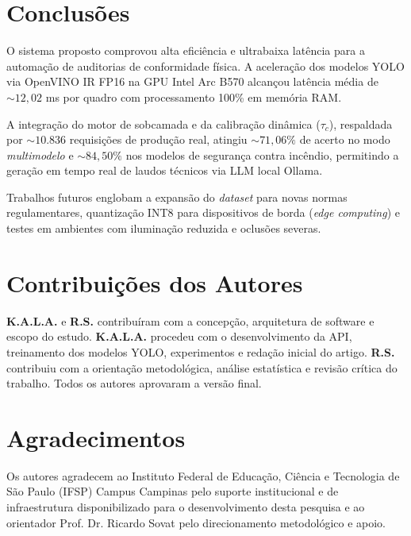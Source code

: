 \documentclass[a4paper,11pt]{article}
\begin{document}
\section*{Conclusões}
O sistema proposto comprovou alta eficiência e ultrabaixa latência para a automação de auditorias de conformidade física. A aceleração dos modelos YOLO via OpenVINO IR FP16 na GPU Intel Arc B570 alcançou latência média de $\sim 12{,}02$ ms por quadro com processamento 100\% em memória RAM.

A integração do motor de sobcamada e da calibração dinâmica ($\tau_c$), respaldada por $\sim 10.836$ requisições de produção real, atingiu $\sim 71{,}06\%$ de acerto no modo \textit{multimodelo} e $\sim 84{,}50\%$ nos modelos de segurança contra incêndio, permitindo a geração em tempo real de laudos técnicos via LLM local Ollama.

Trabalhos futuros englobam a expansão do \textit{dataset} para novas normas regulamentares, quantização INT8 para dispositivos de borda (\textit{edge computing}) e testes em ambientes com iluminação reduzida e oclusões severas.

\section*{Contribuições dos Autores}
\noindent\textbf{K.A.L.A.} e \textbf{R.S.} contribuíram com a concepção, arquitetura de software e escopo do estudo. \textbf{K.A.L.A.} procedeu com o desenvolvimento da API, treinamento dos modelos YOLO, experimentos e redação inicial do artigo. \textbf{R.S.} contribuiu com a orientação metodológica, análise estatística e revisão crítica do trabalho. Todos os autores aprovaram a versão final.

\section*{Agradecimentos}
Os autores agradecem ao Instituto Federal de Educação, Ciência e Tecnologia de São Paulo (IFSP) Campus Campinas pelo suporte institucional e de infraestrutura disponibilizado para o desenvolvimento desta pesquisa e ao orientador Prof. Dr. Ricardo Sovat pelo direcionamento metodológico e apoio.


\end{document}
